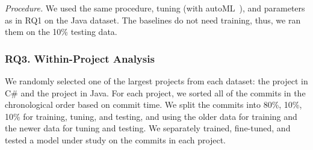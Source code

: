 
\textit{Procedure.}
We used the same procedure, tuning (with autoML~\cite{NNI}), and
parameters as in RQ1 on the Java dataset. The baselines do not need
training, thus, we ran them on the 10\% testing data.






\subsubsection{RQ3. Within-Project Analysis}

We randomly selected one of the largest projects from each dataset:
the  project in C\# and
the  project in Java. For each
project, we sorted all of the commits in the chronological order based
on commit time. We split the commits into 80\%, 10\%, 10\% for
training, tuning, and testing, and using the older data for training
and the newer data for tuning and testing. We separately trained,
fine-tuned, and tested a model under study on the commits in each
project.


